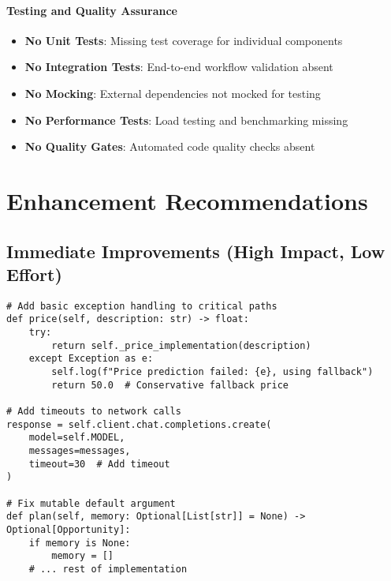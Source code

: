 \paragraph{Testing and Quality Assurance \starfull\starempty\starempty\starempty\starempty}
\begin{itemize}
\item \textbf{No Unit Tests}: Missing test coverage for individual components
\item \textbf{No Integration Tests}: End-to-end workflow validation absent
\item \textbf{No Mocking}: External dependencies not mocked for testing
\item \textbf{No Performance Tests}: Load testing and benchmarking missing
\item \textbf{No Quality Gates}: Automated code quality checks absent
\end{itemize}

\section{Enhancement Recommendations}

\subsection{Immediate Improvements (High Impact, Low Effort)}

\begin{lstlisting}[caption=Quick Error Handling Enhancement]
# Add basic exception handling to critical paths
def price(self, description: str) -> float:
    try:
        return self._price_implementation(description)
    except Exception as e:
        self.log(f"Price prediction failed: {e}, using fallback")
        return 50.0  # Conservative fallback price

# Add timeouts to network calls
response = self.client.chat.completions.create(
    model=self.MODEL,
    messages=messages,
    timeout=30  # Add timeout
)

# Fix mutable default argument
def plan(self, memory: Optional[List[str]] = None) -> Optional[Opportunity]:
    if memory is None:
        memory = []
    # ... rest of implementation
\end{lstlisting}

